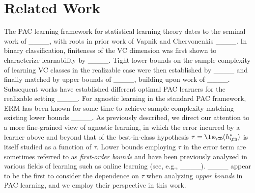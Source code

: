 \section{Related Work}
The PAC learning framework for statistical learning theory dates to the seminal work of ____, with roots in prior work of Vapnik and Chervonenkis ____. In binary classification, finiteness of the VC dimension was first shown to characterize learnability by ____. Tight lower bounds on the sample complexity of learning VC classes in the realizable case were then established by ____ and finally matched by upper bounds of ____, building upon  work of ____. Subsequent works have established different optimal PAC learners for the realizable setting ____.
For agnostic learning in the standard PAC framework, ERM has been known for some time to achieve sample complexity matching existing lower bounds ____. As previously described, we direct our attention to a more fine-grained view of agnostic learning, in which the error incurred by a learner above and beyond that of the best-in-class hypothesis $\tau = \ls_\CD(h^*_\CD)$ is itself studied as a function of $\tau$. Lower bounds employing $\tau$ in the error term are sometimes referred to as \emph{first-order bounds} and have been previously analyzed in various fields of learning such as online learning (see, e.g., ____). ____ appear to be the first to consider the dependence on $\tau$ when analyzing \emph{upper bounds} in PAC learning, and we employ their perspective in this work.